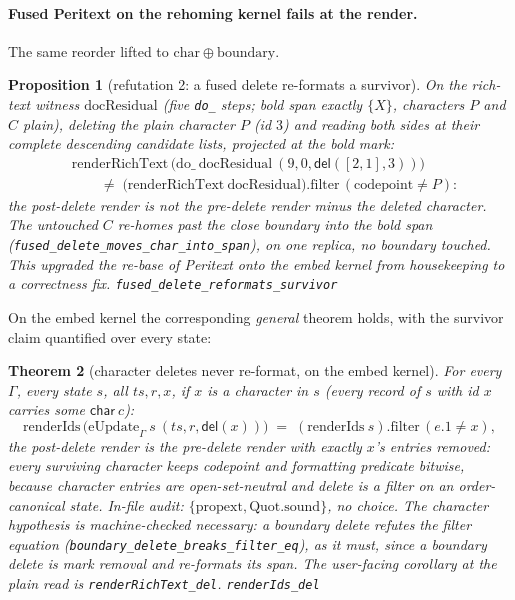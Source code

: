 \documentclass[11pt]{article}
\newtheorem{theorem}{Theorem}[section]
\newtheorem{proposition}[theorem]{Proposition}
\newcommand{\lean}[1]{\texttt{#1}}
\newcommand{\code}[1]{\texttt{#1}}
\newcommand{\del}{\mathsf{del}}
\begin{document}
\paragraph{Fused Peritext on the rehoming kernel fails at the
render.} The same reorder lifted to
$\mathrm{char} \oplus \mathrm{boundary}$.

\begin{proposition}[refutation 2: a fused delete re-formats a
survivor]
\label{prop:fusedreformat}
On the rich-text witness $\mathrm{docResidual}$ (five \code{do\_}
steps; bold span exactly $\{X\}$, characters $P$ and $C$ plain),
deleting the plain character $P$ (id $3$) and reading both sides at
their complete descending candidate lists, projected at the bold
mark:
\[
\begin{aligned}
  &\mathrm{renderRichText}\,
    \bigl(\mathrm{do\_}\ \mathrm{docResidual}\ (9, 0,
    \del([2,1], 3))\bigr) \\
  &\qquad\ne\;
    \bigl(\mathrm{renderRichText}\ \mathrm{docResidual}\bigr)
    .\mathrm{filter}\,(\text{codepoint} \ne P) :
\end{aligned}
\]
the post-delete render is \emph{not} the pre-delete render minus the
deleted character. The untouched $C$ re-homes past the close
boundary into the bold span
(\lean{fused\_delete\_moves\_char\_into\_span}), on one replica, no
boundary touched. This upgraded the re-base of Peritext onto the
embed kernel from housekeeping to a correctness fix.
\hfill\lean{fused\_delete\_reformats\_survivor}
\end{proposition}

\noindent On the embed kernel the corresponding \emph{general}
theorem holds, with the survivor claim quantified over every state:

\begin{theorem}[character deletes never re-format, on the embed
kernel]
\label{thm:renderidsdel}
For every $\Gamma$, every state $s$, all $\mathit{ts}, r, x$, if $x$
is a character in $s$ (every record of $s$ with id $x$ carries some
$\mathsf{char}\ c$):
\[
  \mathrm{renderIds}\,\bigl(\mathrm{eUpdate}_\Gamma\ s\
    (\mathit{ts}, r, \del(x))\bigr)
  \;=\; (\mathrm{renderIds}\ s).\mathrm{filter}\,(e.1 \ne x) ,
\]
the post-delete render is the pre-delete render with exactly $x$'s
entries removed: every surviving character keeps codepoint and
formatting predicate bitwise, because character entries are
open-set-neutral and delete is a filter on an order-canonical state.
In-file audit: $\{\mathrm{propext}, \mathrm{Quot.sound}\}$, no
choice. The character hypothesis is machine-checked necessary: a
\emph{boundary} delete refutes the filter equation
(\lean{boundary\_delete\_breaks\_filter\_eq}), as it must, since a
boundary delete is mark removal and re-formats its span. The
user-facing corollary at the plain read is
\lean{renderRichText\_del}.
\hfill\lean{renderIds\_del}
\end{theorem}
\end{document}

